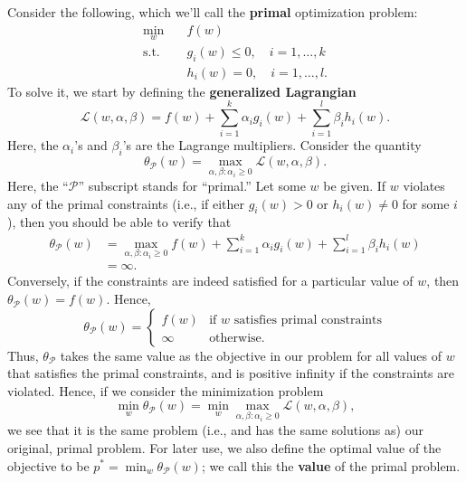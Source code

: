 Consider the following, which we'll call the \textbf{primal} optimization problem:
\begin{align*}
    \min_w \quad& f(w)\\
    \operatorname{s.t.} \quad& g_i (w) \le 0,\quad i = 1,\ldots ,k\\
    \quad& h_i (w) = 0, \quad i = 1,\ldots ,l.
\end{align*}
To solve it, we start by defining the \textbf{generalized Lagrangian}
\begin{equation*}
    \mathcal L(w,\alpha,\beta) = f(w) + \sum_{i=1}^k \alpha_i g_i(w) + \sum_{i=1}^l \beta_i h_i(w).
\end{equation*}
Here, the $\alpha_i$'s and $\beta_i$'s are the Lagrange multipliers. Consider the quantity
\begin{equation*}
    \theta_{\mathcal P}(w) = \max_{\alpha,\beta :\alpha_i \ge 0} \mathcal L(w,\alpha,\beta).
\end{equation*}
Here, the ``$\mathcal P$'' subscript stands for ``primal.'' Let some $w$ be given. If $w$
violates any of the primal constraints (i.e., if either $g_i (w) > 0$ or $h_i (w) \ne 0$
for some $i$), then you should be able to verify that
\begin{align*}
    \theta_{\mathcal P}(w) &= \max_{\alpha,\beta :\alpha_i \ge 0} f(w) + \sum_{i=1}^k \alpha_i g_i(w) + \sum_{i=1}^l \beta_i h_i (w)\\
    &= \infty.\label{eq:primal_violated}
\end{align*}
Conversely, if the constraints are indeed satisfied for a particular value of $w$,
then $\theta_{\mathcal{P}}(w) = f(w)$. Hence,
\begin{equation*}
    \theta_{\mathcal P} (w) = \begin{cases}
        f(w) & \text{if $w$ satisfies primal constraints}\\
        \infty & \text{otherwise}.
    \end{cases}    
\end{equation*}
Thus, $\theta_{\mathcal P}$ takes the same value as the objective in our problem for all values
of $w$ that satisfies the primal constraints, and is positive infinity if the
constraints are violated. Hence, if we consider the minimization problem
\begin{equation*}
    \min_w \theta_{\mathcal P}(w) = \min_w \max_{\alpha,\beta :\alpha_i \ge 0} \mathcal L(w,\alpha,\beta),
\end{equation*}
we see that it is the same problem (i.e., and has the same solutions as) our
original, primal problem. For later use, we also define the optimal value of
the objective to be $p^* = \min_w \theta_{\mathcal P} (w)$; we call this the \textbf{value} of the primal
problem.

